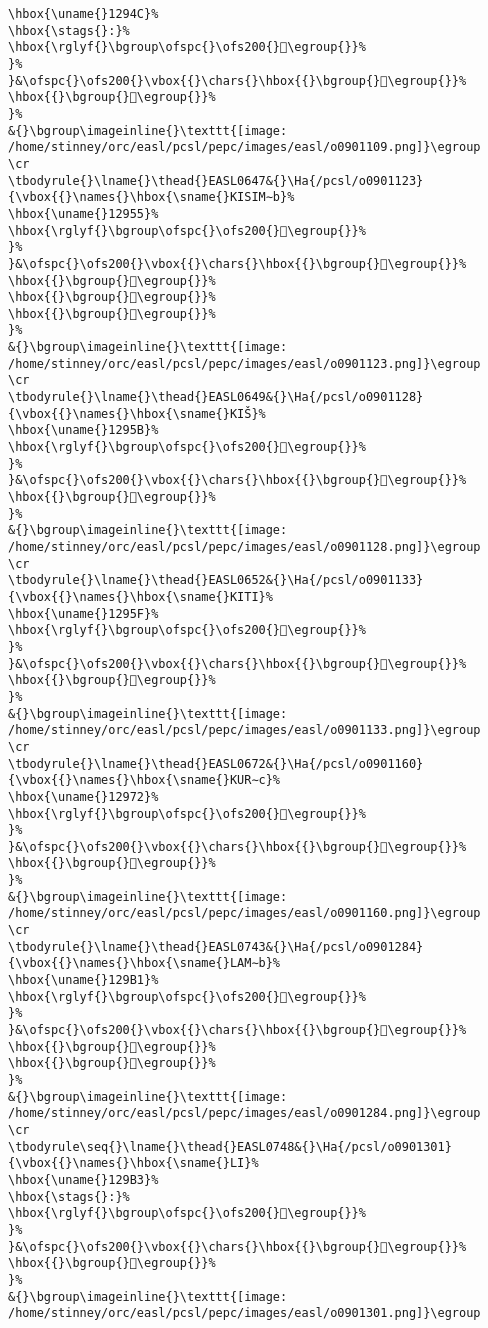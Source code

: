 \begin{verbatim}
\hbox{\uname{}1294C}%
\hbox{\stags{}:}%
\hbox{\rglyf{}\bgroup\ofspc{}\ofs200{}𒥌\egroup{}}%
}%
}&\ofspc{}\ofs200{}\vbox{{}\chars{}\hbox{{}\bgroup{}𒥋\egroup{}}%
\hbox{{}\bgroup{}𒥌\egroup{}}%
}%
&{}\bgroup\imageinline{}\texttt{[image: /home/stinney/orc/easl/pcsl/pepc/images/easl/o0901109.png]}\egroup
\cr
\tbodyrule{}\lname{}\thead{}EASL0647&{}\Ha{/pcsl/o0901123}{\vbox{{}\names{}\hbox{\sname{}KISIM∼b}%
\hbox{\uname{}12955}%
\hbox{\rglyf{}\bgroup\ofspc{}\ofs200{}𒥕\egroup{}}%
}%
}&\ofspc{}\ofs200{}\vbox{{}\chars{}\hbox{{}\bgroup{}𒥕\egroup{}}%
\hbox{{}\bgroup{}𒥖\egroup{}}%
\hbox{{}\bgroup{}𒥗\egroup{}}%
\hbox{{}\bgroup{}𒥘\egroup{}}%
}%
&{}\bgroup\imageinline{}\texttt{[image: /home/stinney/orc/easl/pcsl/pepc/images/easl/o0901123.png]}\egroup
\cr
\tbodyrule{}\lname{}\thead{}EASL0649&{}\Ha{/pcsl/o0901128}{\vbox{{}\names{}\hbox{\sname{}KIŠ}%
\hbox{\uname{}1295B}%
\hbox{\rglyf{}\bgroup\ofspc{}\ofs200{}𒥛\egroup{}}%
}%
}&\ofspc{}\ofs200{}\vbox{{}\chars{}\hbox{{}\bgroup{}𒥚\egroup{}}%
\hbox{{}\bgroup{}𒥛\egroup{}}%
}%
&{}\bgroup\imageinline{}\texttt{[image: /home/stinney/orc/easl/pcsl/pepc/images/easl/o0901128.png]}\egroup
\cr
\tbodyrule{}\lname{}\thead{}EASL0652&{}\Ha{/pcsl/o0901133}{\vbox{{}\names{}\hbox{\sname{}KITI}%
\hbox{\uname{}1295F}%
\hbox{\rglyf{}\bgroup\ofspc{}\ofs200{}𒥟\egroup{}}%
}%
}&\ofspc{}\ofs200{}\vbox{{}\chars{}\hbox{{}\bgroup{}𒥞\egroup{}}%
\hbox{{}\bgroup{}𒥟\egroup{}}%
}%
&{}\bgroup\imageinline{}\texttt{[image: /home/stinney/orc/easl/pcsl/pepc/images/easl/o0901133.png]}\egroup
\cr
\tbodyrule{}\lname{}\thead{}EASL0672&{}\Ha{/pcsl/o0901160}{\vbox{{}\names{}\hbox{\sname{}KUR∼c}%
\hbox{\uname{}12972}%
\hbox{\rglyf{}\bgroup\ofspc{}\ofs200{}𒥲\egroup{}}%
}%
}&\ofspc{}\ofs200{}\vbox{{}\chars{}\hbox{{}\bgroup{}𒥱\egroup{}}%
\hbox{{}\bgroup{}𒥲\egroup{}}%
}%
&{}\bgroup\imageinline{}\texttt{[image: /home/stinney/orc/easl/pcsl/pepc/images/easl/o0901160.png]}\egroup
\cr
\tbodyrule{}\lname{}\thead{}EASL0743&{}\Ha{/pcsl/o0901284}{\vbox{{}\names{}\hbox{\sname{}LAM∼b}%
\hbox{\uname{}129B1}%
\hbox{\rglyf{}\bgroup\ofspc{}\ofs200{}𒦱\egroup{}}%
}%
}&\ofspc{}\ofs200{}\vbox{{}\chars{}\hbox{{}\bgroup{}𒦭\egroup{}}%
\hbox{{}\bgroup{}𒦱\egroup{}}%
\hbox{{}\bgroup{}𒦲\egroup{}}%
}%
&{}\bgroup\imageinline{}\texttt{[image: /home/stinney/orc/easl/pcsl/pepc/images/easl/o0901284.png]}\egroup
\cr
\tbodyrule\seq{}\lname{}\thead{}EASL0748&{}\Ha{/pcsl/o0901301}{\vbox{{}\names{}\hbox{\sname{}LI}%
\hbox{\uname{}129B3}%
\hbox{\stags{}:}%
\hbox{\rglyf{}\bgroup\ofspc{}\ofs200{}𒦳\egroup{}}%
}%
}&\ofspc{}\ofs200{}\vbox{{}\chars{}\hbox{{}\bgroup{}𒦳\egroup{}}%
\hbox{{}\bgroup{}𒦴\egroup{}}%
}%
&{}\bgroup\imageinline{}\texttt{[image: /home/stinney/orc/easl/pcsl/pepc/images/easl/o0901301.png]}\egroup

\end{verbatim}
